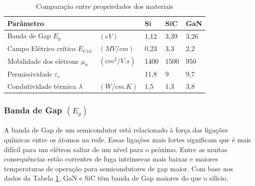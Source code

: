 \begin{table}[!htb]
\centering
\caption{Comparação entre propriedades dos materiais \cite{lidow_rooij_strydom_reusch_glaser_2020}}
\begin{tabular}{lllll}
\hline
Parâmetro           &                & Si    & SiC   & GaN \\ \hline
Banda de Gap $E_g$& $(eV)$             & 1,12  & 3,39  & 3,26\\
Campo Elétrico crítico $E_{Crit}$ &$(MV/cm)$   & 0,23  & 3,3   & 2,2\\
Mobilidade dos elétrons $\mu_n$ &$(cm^2/V.s)$& 1400  & 1500  & 950\\
Permissividade $\varepsilon_r$ &     & 11,8  & 9     & 9,7\\
Condutividade térmica $\lambda$& $(W/cm.K)$     & 1,5   & 1,3   & 3,8\\ \hline
\end{tabular}
\label{t_materiais}
\end{table}

\subsubsection{Banda de Gap $(E_g)$}
A banda de Gap de um semicondutor está relacionado à força das ligações químicas entre os átomos na rede. Essas ligações mais fortes significam que é mais difícil para um elétron saltar de um nível para o próximo. Entre as muitas consequências estão correntes de fuga intrínsecas mais baixas e maiores temperaturas de operação para semicondutores de gap maior. Com base nos dados da Tabela \ref{t_materiais}, GaN e SiC têm banda de Gap maiores do que o silício. \cite{lidow_rooij_strydom_reusch_glaser_2020}

